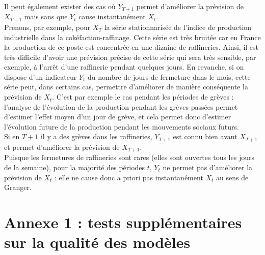 \documentclass[french]{article}
\begin{document}
Il peut également exister des cas où \(Y_{T+1}\) permet d'améliorer la prévision de \(X_{T+1}\) mais sans que \(Y_t\) cause instantanément \(X_t\).\\
Prenons, par exemple, pour \(X_T\) la série stationnarisée de l'indice de production industrielle dans la cokéfaction-raffinage.
Cette série est très bruitée car en France la production de ce poste est concentrée en une dizaine de raffineries.
Ainsi, il est très difficile d'avoir une prévision précise de cette série qui sera très sensible, par exemple, à l'arrêt d'une raffinerie pendant quelques jours.
En revanche, si on dispose d'un indicateur \(Y_t\) du nombre de jours de fermeture dans le mois, cette série peut, dans certains cas, permettre d'améliorer de manière conséquente la prévision de \(X_t\).
C'est par exemple le cas pendant les périodes de grèves : l'analyse de l'évolution de la production pendant les grèves passées permet d'estimer l'effet moyen d'un jour de grève, et cela permet donc d'estimer l'évolution future de la production pendant les mouvements sociaux futurs.\\
Si en \(T+1\) il y a des grèves dans les raffineries, \(Y_{T+1}\) est connu bien avant \(X_{T+1}\) et permet d'améliorer la prévision de \(X_{T+1}\).\\
Puisque les fermetures de raffineries sont rares (elles sont ouvertes tous les jours de la semaine), pour la majorité des périodes \(t\), \(Y_t\) ne permet pas d'améliorer la prévision de \(X_t\) : elle ne cause donc a priori pas instantanément \(X_t\) au sens de Granger.

\newpage

\hypertarget{appendix-appendix}{%
\appendix}


\setcounter{page}{0}

\hypertarget{sec:qualRes}{%
\section{Annexe 1 : tests supplémentaires sur la qualité des modèles}\label{sec:qualRes}}
\end{document}
